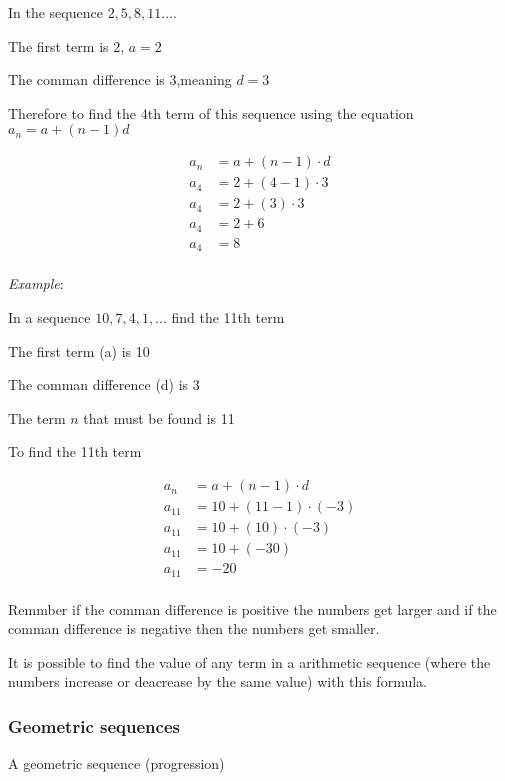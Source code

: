 \documentclass[]{article}
\begin{document}
In the sequence $2, 5, 8, 11 ...$.  

The first term is $ 2  $, $ a = 2  $

The comman difference is $ 3  $,meaning  $ d = 3  $

Therefore to find the 4th term of this sequence using the equation $ a_{n} = a + (n-1)d$

\begin{align}  
    a_{n} &= a + (n-1) \cdot d  \\
    a_{4} &= 2 + (4-1) \cdot  3  \\
    a_{4} &= 2 + (3) \cdot 3   \\
    a_{4} &= 2 + 6  \\
    a_{4} &= 8  \\
\end{align}  


\textit{Example}: 

In a sequence $ 10, 7, 4, 1, ...  $ find the 11th term
 
The first term (a) is 10 

The comman difference (d) is 3

The term $ n  $ that must be found is 11

To find the 11th term

\begin{align}
    a_{n} &= a + (n-1) \cdot d \\
    a_{11} &= 10 + (11-1) \cdot (-3 )\\
    a_{11} &= 10 + (10) \cdot (-3) \\
    a_{11} &= 10 + (-30) \\
    a_{11} &= -20 \\
\end{align}

Remmber if the comman difference is positive the numbers get larger and if the comman difference is negative then the numbers get smaller.

It is possible to find the value of any term in a arithmetic sequence (where the numbers increase or deacrease by the same value)
with this formula.

\subsubsection{Geometric sequences}

A geometric sequence (progression)
\end{document}
